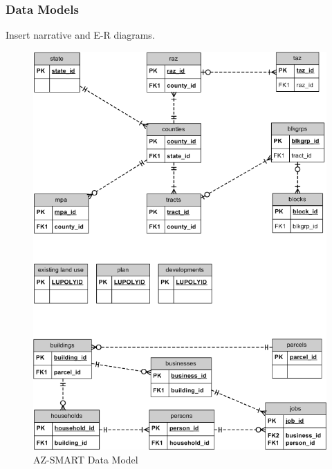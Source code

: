 \subsubsection{Data Models}
Insert narrative and E-R diagrams.



\begin{figure}[h]
\begin{center}
\includegraphics[scale=0.5]{figures/AZ_SMART_data_model_diagram.png}
\caption{AZ-SMART Data Model}
\end{center}
\end{figure}